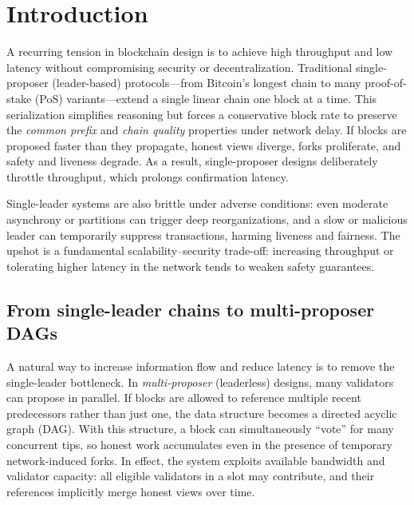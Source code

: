 

\section{Introduction}
\label{sec:intro}

A recurring tension in blockchain design is to achieve high throughput and low latency without compromising security or decentralization. Traditional single-proposer (leader-based) protocols---from Bitcoin's longest chain to many proof-of-stake (PoS) variants---extend a single linear chain one block at a time. This serialization simplifies reasoning but forces a conservative block rate to preserve the \emph{common prefix} and \emph{chain quality} properties under network delay. If blocks are proposed faster than they propagate, honest views diverge, forks proliferate, and safety and liveness degrade. As a result, single-proposer designs deliberately throttle throughput, which prolongs confirmation latency.

Single-leader systems are also brittle under adverse conditions: even moderate asynchrony or partitions can trigger deep reorganizations, and a slow or malicious leader can temporarily suppress transactions, harming liveness and fairness. The upshot is a fundamental scalability--security trade-off: increasing throughput or tolerating higher latency in the network tends to weaken safety guarantees.

\subsection{From single-leader chains to multi-proposer DAGs} 
A natural way to increase information flow and reduce latency is to remove the single-leader bottleneck. In \emph{multi-proposer} (leaderless) designs, many validators can propose in parallel. If blocks are allowed to reference multiple recent predecessors rather than just one, the data structure becomes a directed acyclic graph (DAG). With this structure, a block can simultaneously “vote” for many concurrent tips, so honest work accumulates even in the presence of temporary network-induced forks. In effect, the system exploits available bandwidth and validator capacity: all eligible validators in a slot may contribute, and their references implicitly merge honest views over time.

